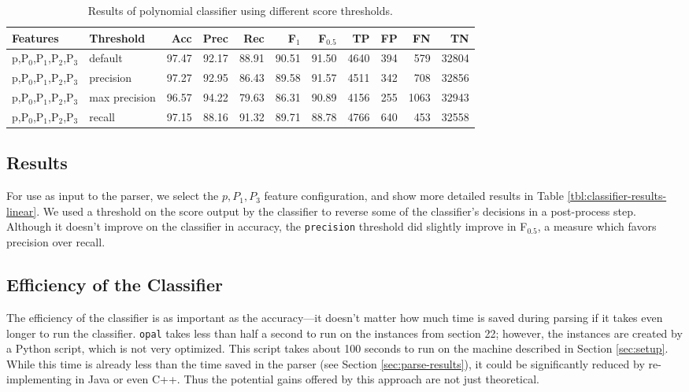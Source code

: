 \documentclass[11pt]{article}
\begin{document}
\begin{table}[htbp]

\begin{tabular}{llrrrrrrrrr}
{\bf Features} & {\bf Threshold} & {\bf Acc} & {\bf Prec} & {\bf Rec} & {\bf F$_{\text{1}}$} & {\bf F$_{\text{0.5}}$} & {\bf TP} & {\bf FP} & {\bf FN} & {\bf TN} \\
\hline
p,P$_{\text{0}}$,P$_{\text{1}}$,P$_{\text{2}}$,P$_{\text{3}}$ & default & 97.47 & 92.17 & 88.91 & 90.51 & 91.50 & 4640 & 394 & 579 & 32804\\
p,P$_{\text{0}}$,P$_{\text{1}}$,P$_{\text{2}}$,P$_{\text{3}}$ & precision & 97.27 & 92.95 & 86.43 & 89.58 & 91.57 & 4511 & 342 & 708 & 32856\\
p,P$_{\text{0}}$,P$_{\text{1}}$,P$_{\text{2}}$,P$_{\text{3}}$ & max precision & 96.57 & 94.22 & 79.63 & 86.31 & 90.89 & 4156 & 255 & 1063 & 32943\\
p,P$_{\text{0}}$,P$_{\text{1}}$,P$_{\text{2}}$,P$_{\text{3}}$ & recall & 97.15 & 88.16 & 91.32 & 89.71 & 88.78 & 4766 & 640 & 453 & 32558\\
\end{tabular}

\caption{Results of polynomial classifier using different score thresholds.}
\label{tbl:classifier-results-poly}
\end{table}

\subsection{Results}
\label{sec-4-4}

\label{sec:linear-classifier}
For use as input to the parser, we select the $p,P_{1},P_{3}$
feature configuration, and show more detailed results in
Table \ref{tbl:classifier-results-linear}. We used a threshold on the
score output by the classifier to reverse some of the classifier's
decisions in a post-process step. Although it doesn't improve on the
classifier in accuracy, the \texttt{precision} threshold did slightly improve in
F$_{\text{0.5}}$, a measure which favors precision over recall.

\subsection{Efficiency of the Classifier}
\label{sec-4-5}

The efficiency of the classifier is as important as the accuracy---it doesn't
matter how much time is saved during parsing if it takes even longer to run the
classifier. \texttt{opal} takes less than half a second to run on the instances from
section 22; however, the instances are created by a Python script, which is not
very optimized. This script takes about 100 seconds to run on the machine
described in Section \ref{sec:setup}. While this time is already less than the
time saved in the parser (see Section \ref{sec:parse-results}), it could be
significantly reduced by re-implementing in Java or even C++. Thus the potential
gains offered by this approach are not just theoretical.
\end{document}
